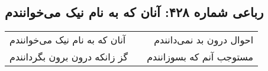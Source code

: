 \begin{center}
\section*{رباعی شماره ۴۲۸: آنان که به نام نیک می‌خوانندم}
\label{sec:sh428}
\begin{longtable}{l p{0.5cm} r}
آنان که به نام نیک می‌خوانندم
&&
احوال درون بد نمی‌دانندم
\\
گز زانکه درون برون بگردانندم
&&
مستوجب آنم که بسوزانندم
\\
\end{longtable}
\end{center}
